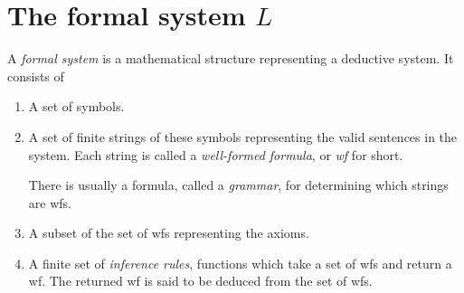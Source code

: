 \section{The formal system \texorpdfstring{\(L\)}{L}}

A \textit{formal system} is a mathematical structure representing a deductive system. It consists of
\begin{enumerate}
  \item A set of symbols.

  \item A set of finite strings of these symbols representing the valid sentences in the system. Each string is called a \textit{well-formed formula}, or \textit{wf} for short.

    There is usually a formula, called a \textit{grammar}, for determining which strings are wfs.

  \item A subset of the set of wfs representing the axioms.

  \item A finite set of \textit{inference rules}, functions which take a set of wfs and return a wf. The returned wf is said to be deduced from the set of wfs.
\end{enumerate}
